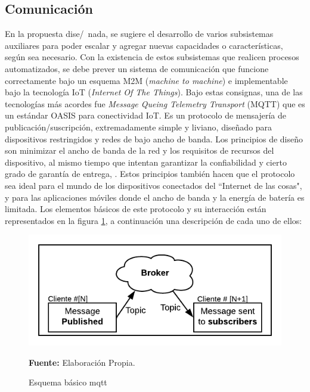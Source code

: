 \subsection{Comunicaci\'on}
En la propuesta dise/~nada, se sugiere el desarrollo de varios subsistemas auxiliares para poder escalar y agregar nuevas capacidades o caracter\'isticas, seg\'un sea necesario.
Con la existencia de estos subsistemas que realicen procesos automatizados, se debe prever un sistema de comunicaci\'on que funcione correctamente bajo un esquema M2M (\textit{machine to machine}) e implementable bajo la tecnolog\'ia IoT (\textit{Internet Of The Things}). 
Bajo estas consignas, una de las tecnolog\'ias m\'as acordes fue \textit{Message Queing Telemetry Transport} (MQTT) que es un est\'andar OASIS para conectividad IoT. Es un protocolo de mensajer\'ia de publicaci\'on/suscripci\'on, extremadamente simple y liviano, dise\~nado para dispositivos restringidos y redes de bajo ancho de banda. Los principios de dise\~no son minimizar el ancho de banda de la red y los requisitos de recursos del dispositivo, al mismo tiempo que intentan garantizar la confiabilidad y cierto grado de garant\'ia de entrega, \cite{mqtt-no-date}. Estos principios tambi\'en hacen que el protocolo sea ideal para el mundo de los dispositivos conectados del ``Internet de las cosas", y para las aplicaciones m\'oviles donde el ancho de banda y la energ\'ia de bater\'ia es limitada.
Los elementos b\'asicos de este protocolo y su interacci\'on est\'an representados en la figura  \ref{fig:mqtt}, a continuaci\'on una descripci\'on de cada uno de ellos:
  \begin{figure}[ht]
        \centering
        \includegraphics[scale=0.6]{Imagenes/cap3/Esquema Mqtt.png}
        \caption[Esquema b\'asico mqtt]{Esquema b\'asico mqtt}\textbf{Fuente:} Elaboraci\'on Propia.
        \label{fig:mqtt}
    \end{figure}
    
